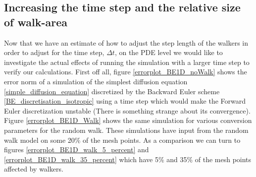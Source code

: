 \subsection{Increasing the time step and the relative size of walk-area}\label{increasing_dt}

Now that we have an estimate of how to adjust the step length of the walkers in order to adjust for the time step, $\Delta t$, on the PDE level we would like to investigate the actual effects of running the simulation with a larger time step to verify our calculations. 
First off all, figure \ref{errorplot_BE1D_noWalk} shows the error norm of a simulation of the simplest diffusion equation \ref{simple_diffusion_equation} discretized by the Backward Euler scheme \ref{BE_discretisation_isotropic} using a time step which would make the Forward Euler discretization unstable (There is something strange about its convergence). 
Figure \ref{errorplot_BE1D_Walk} shows the same simulation for various conversion parameters for the random walk. 
These simulations have input from the random walk model on some 20\% of the mesh points. 
As a comparison we can turn to figures \ref{errorplot_BE1D_walk_5_percent} and \ref{errorplot_BE1D_walk_35_percent} which have 5\% and 35\% of the mesh points affected by walkers.

